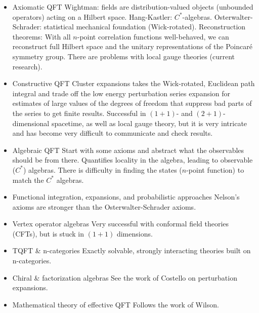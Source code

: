 \begin{itemize}
\item Axiomatic QFT
	\subitem Wightman: fields are distribution-valued objects (unbounded operators) acting on a Hilbert space.
	\subitem Hang-Kastler: $C^*$-algebras.
	\subitem Osterwalter-Schrader: statistical mechanical foundation (Wick-rotated).
	\subitem Reconstruction theorems: With all $n$-point correlation functions well-behaved, we can reconstruct full Hilbert space and the unitary representations of the Poincar\'e symmetry group.
	\subitem There are problems with local gauge theories (current research).
\item Constructive QFT
	\subitem Cluster expansions takes the Wick-rotated, Euclidean path integral and trade off the low energy perturbation series expansion for estimates of large values of the degrees of freedom that suppress bad parts of the series to get finite results.
	\subitem Successful in $(1+1)$- and $(2+1)$-dimensional spacetime, as well as local gauge theory, but it is very intricate and has become very difficult to communicate and check results.
\item Algebraic QFT
	\subitem Start with some axioms and abstract what the observables should be from there.
	\subitem Quantifies locality in the algebra, leading to observable ($C^*$) algebras.
	\subitem There is difficulty in finding the states ($n$-point function) to match the $C^*$ algebras.
\item Functional integration, expansions, and probabilistic approaches
	\subitem Nelson's axioms are stronger than the Osterwalter-Schrader axioms.
\item Vertex operator algebras
	\subitem Very successful with conformal field theories (CFTs), but is stuck in $(1+1)$ dimensions.
\item TQFT \& n-categories
	\subitem Exactly solvable, strongly interacting theories built on n-categories.
\item Chiral \& factorization algebras
	\subitem See the work of Costello on perturbation expansions.
\item Mathematical theory of effective QFT
	\subitem Follows the work of Wilson.
\end{itemize}

